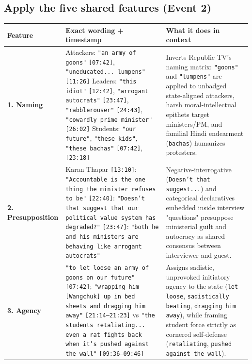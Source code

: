 \documentclass[10pt,a4paper]{article}
\begin{document}
\subsection*{Apply the five shared features (Event 2)}
\begin{longtable}{@{}>{\raggedright\arraybackslash}p{} >{\raggedright\arraybackslash}p{} >{\raggedright\arraybackslash}p{}@{}}
\toprule
\textbf{Feature} & \textbf{Exact wording + timestamp} & \textbf{What it does in context} \\
\midrule
\endhead
\textbf{1. Naming} & Attackers: \texttt{"an army of goons"} \texttt{[07:42]}, \texttt{"uneducated... lumpens"} \texttt{[11:26]} \newline  Leaders: \texttt{"this idiot"} \texttt{[12:42]}, \texttt{"arrogant autocrats"} \texttt{[23:47]}, \texttt{"rabblerouser"} \texttt{[24:43]}, \texttt{"cowardly prime minister"} \texttt{[26:02]} \newline  Students: \texttt{"our future"}, \texttt{"these kids"}, \texttt{"these bachas"} \texttt{[07:42]}, \texttt{[23:18]} & Inverts Republic TV's naming matrix: \texttt{"goons"} and \texttt{"lumpens"} are applied to unbadged state-aligned attackers, harsh moral-intellectual epithets target ministers/PM, and familial Hindi endearment (\texttt{bachas}) humanizes protesters. \\
\addlinespace[4pt]
\textbf{2. Presupposition} & Karan Thapar \texttt{[13:10]}: \texttt{"Accountable is the one thing the minister refuses to be"} \newline  \texttt{[22:40]}: \texttt{"Doesn't that suggest that our political value system has degraded?"} \newline  \texttt{[23:47]}: \texttt{"both he and his ministers are behaving like arrogant autocrats"} & Negative-interrogative (\texttt{Doesn't that suggest...}) and categorical declaratives embedded inside interview "questions" presuppose ministerial guilt and autocracy as shared consensus between interviewer and guest. \\
\addlinespace[4pt]
\textbf{3. Agency} & \texttt{"to let loose an army of goons on our future"} \texttt{[07:42]}; \texttt{"wrapping him [Wangchuk] up in bed sheets and dragging him away"} \texttt{[21:14--21:23]} vs \texttt{"the students retaliating... even a rat fights back when it's pushed against the wall"} \texttt{[09:36--09:46]} & Assigns sadistic, unprovoked initiatory agency to the state (\texttt{let loose}, \texttt{sadistically beating}, \texttt{dragging him away}), while framing student force strictly as cornered self-defense (\texttt{retaliating}, \texttt{pushed against the wall}). \\

\end{longtable}
\end{document}
